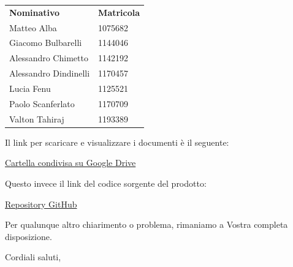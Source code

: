 \documentclass[12pt]{letter}
\begin{document}
\begin{letter}{ }
\begin{center}
   \centering
   \begin{tabular}{ll}
     \textbf{Nominativo}        & \textbf{Matricola} \\
     Matteo Alba                     &  1075682 \\
	 Giacomo Bulbarelli              &  1144046 \\
	 Alessandro Chimetto             &  1142192 \\
	 Alessandro Dindinelli           &  1170457 \\
	 Lucia Fenu                      &  1125521 \\
     Paolo Scanferlato               &  1170709 \\
     Valton Tahiraj                  &  1193389 \\
   \end{tabular}
 \end{center}



Il link per scaricare e visualizzare i documenti è il seguente:

\begin{center}
\href{https://drive.google.com/drive/folders/193yY7AatYiKF6b8MC9qfJuRvbln97p5a}{Cartella condivisa su Google Drive}
\end{center}

Questo invece il link del codice sorgente del prodotto:

\begin{center}
	\href{https://github.com/lineCode-swe/portacs}{Repository GitHub}
\end{center}


Per qualunque altro chiarimento o problema, rimaniamo a Vostra completa disposizione.

\closing{Cordiali saluti,}

\vspace{3em}

\end{letter}
\end{document}
